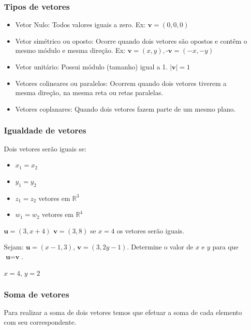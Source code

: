 \documentclass[12pt]{article}
\begin{document}
\subsubsection{Tipos de vetores}

\singlespacing
\begin{itemize}
	\item Vetor Nulo: Todos valores iguais a zero. Ex: \(\textbf{v} = (0,0,0)\)
	\item Vetor simétrico ou oposto: Ocorre quando dois vetores são opostos e contêm o mesmo módulo e mesma direção. Ex: \(\textbf{v} = (x,y), \textbf{-v} = (-x,-y)\)
	\item Vetor unitário: Possui módulo (tamanho) igual a 1. \(|\textbf{v}| = 1\)
	\item Vetores colineares ou paralelos: Ocorrem quando dois vetores tiverem a mesma direção, na mesma reta ou retas paralelas.
	\item Vetores coplanares: Quando dois vetores fazem parte de um mesmo plano.
\end{itemize}
\onehalfspacing
\pagebreak

\subsubsection{Igualdade de vetores}

Dois vetores serão iguais se: 

\singlespacing
\begin{itemize}
	\item \(x_{1} = x_{2}\)
	\item \(y_{1} = y_{2}\)
	\item \(z_{1} = z_{2}\) vetores em \(\mathbb{R}^3\)
	\item \(w_{1} = w_{2}\) vetores em \(\mathbb{R}^4\)
\end{itemize}
\onehalfspacing

\(\textbf{u} = (3, x + 4)\) \(\textbf{v} = (3, 8)\) se \(x = 4\) os vetores serão iguais.

Sejam: \(\textbf{u} = (x-1, 3)\), \(\textbf{v} = (3, 2y-1)\). Determine o valor de \(x\) e \(y\) para que \(\textbf{u} = \textbf{v}\).

\(x = 4\), \(y = 2\)

\subsubsection{Soma de vetores}

Para realizar a soma de dois vetores temos que efetuar a soma de cada elemento com seu correspondente.
\end{document}
